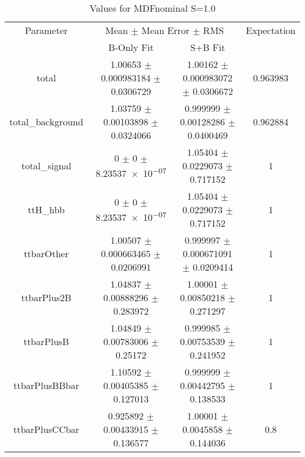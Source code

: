 \begin{table}
\centering
\caption{Values for MDFnominal S=1.0}
\begin{tabular}{cccc}
\toprule
Parameter & \multicolumn{2}{c}{Mean $\pm$ Mean Error $\pm$ RMS} & Expectation\\
 & B-Only Fit & S+B Fit & \\
\midrule
total & \num{1.00653} $\pm$ \num{0.000983184} $\pm$ \num{0.0306729} & \num{1.00162} $\pm$ \num{0.000983072} $\pm$ \num{0.0306672} & \num{0.963983}\\
total\_background & \num{1.03759} $\pm$ \num{0.00103898} $\pm$ \num{0.0324066} & \num{0.999999} $\pm$ \num{0.00128286} $\pm$ \num{0.0400469} & \num{0.962884}\\
total\_signal & \num{0} $\pm$ \num{0} $\pm$ \num{8.23537e-07} & \num{1.05404} $\pm$ \num{0.0229073} $\pm$ \num{0.717152} & \num{1}\\
ttH\_hbb & \num{0} $\pm$ \num{0} $\pm$ \num{8.23537e-07} & \num{1.05404} $\pm$ \num{0.0229073} $\pm$ \num{0.717152} & \num{1}\\
ttbarOther & \num{1.00507} $\pm$ \num{0.000663465} $\pm$ \num{0.0206991} & \num{0.999997} $\pm$ \num{0.000671091} $\pm$ \num{0.0209414} & \num{1}\\
ttbarPlus2B & \num{1.04837} $\pm$ \num{0.00888296} $\pm$ \num{0.283972} & \num{1.00001} $\pm$ \num{0.00850218} $\pm$ \num{0.271297} & \num{1}\\
ttbarPlusB & \num{1.04849} $\pm$ \num{0.00783006} $\pm$ \num{0.25172} & \num{0.999985} $\pm$ \num{0.00753539} $\pm$ \num{0.241952} & \num{1}\\
ttbarPlusBBbar & \num{1.10592} $\pm$ \num{0.00405385} $\pm$ \num{0.127013} & \num{0.999999} $\pm$ \num{0.00442795} $\pm$ \num{0.138533} & \num{1}\\
ttbarPlusCCbar & \num{0.925892} $\pm$ \num{0.00433915} $\pm$ \num{0.136577} & \num{1.00001} $\pm$ \num{0.0045858} $\pm$ \num{0.144036} & \num{0.8}\\
\bottomrule
\end{tabular}
\end{table}